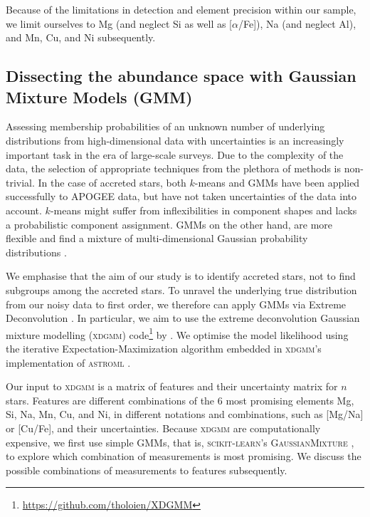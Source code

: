\documentclass[fleqn,usenatbib]{mnras}
\begin{document}
Because of the limitations in detection and element precision within our sample, we limit ourselves to Mg (and neglect Si as well as [$\alpha$/Fe]), Na (and neglect Al), and Mn, Cu, and Ni subsequently.

\subsection{Dissecting the abundance space with Gaussian Mixture Models (GMM)} \label{sec:gaussian_mixture_models}

Assessing membership probabilities of an unknown number of underlying distributions from high-dimensional data with uncertainties is an increasingly important task in the era of large-scale surveys. Due to the complexity of the data, the selection of appropriate techniques from the plethora of methods is non-trivial. In the case of accreted stars, both $k$-means \citep{Hayes2018, Mackereth2019} and GMMs \citep{Das2020} have been applied successfully to APOGEE data, but have not taken uncertainties of the data into account. $k$-means might suffer from inflexibilities in component shapes and lacks a probabilistic component assignment. GMMs on the other hand, are more flexible and find a mixture of multi-dimensional Gaussian probability distributions \citep{VanderPlas2016}.

We emphasise that the aim of our study is to identify accreted stars, not to find subgroups among the accreted stars. To unravel the underlying true distribution from our noisy data to first order, we therefore can apply GMMs via Extreme Deconvolution \citep[XD,][]{Bovy2011}. In particular, we aim to use the extreme deconvolution Gaussian mixture modelling (\textsc{xdgmm}) code\footnote{\url{https://github.com/tholoien/XDGMM}} by \citet{Holoien2017}. We optimise the model likelihood using the iterative Expectation-Maximization algorithm \citep{Dempster1977} embedded in \textsc{xdgmm}'s implementation of \textsc{astroml} \citep{astroml}.

Our input to \textsc{xdgmm} is a matrix of features and their uncertainty matrix for $n$ stars. Features are different combinations of the 6 most promising elements Mg, Si, Na, Mn, Cu, and Ni, in different notations and combinations, such as [Mg/Na] or [Cu/Fe], and their uncertainties. Because \textsc{xdgmm} are computationally expensive, we first use simple GMMs, that is, \textsc{scikit-learn}'s \textsc{GaussianMixture} \citep{scikit-learn}, to explore which combination of measurements is most promising. We discuss the possible combinations of measurements to features subsequently.
\end{document}
